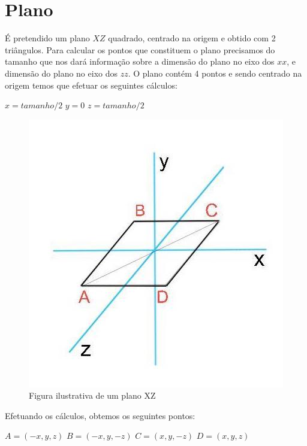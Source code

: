\documentclass[12pt]{article}
\begin{document}
\section{Plano}
É pretendido um plano $XZ$ quadrado, centrado na origem e obtido com 2 triângulos. 
Para calcular os pontos que constituem o plano precisamos do tamanho que nos dará informação sobre a dimensão do plano
no eixo dos $xx$, e dimensão do plano no eixo dos $zz$. 
O plano contém 4 pontos e sendo centrado na origem temos que efetuar os seguintes cálculos: \newline
\begin{center}
$x = tamanho/2$ \newline
$y = 0$ \newline
$z = tamanho/2$ \newline
\end{center}
\begin{figure}[H]
\centering\includegraphics[scale=0.4]{planoXZ} 
\caption{\label{fig:controller}Figura ilustrativa de um plano XZ}
\end{figure} 
Efetuando os cálculos, obtemos os seguintes pontos: \newline
\begin{center}
$A = (-x,y,z)$ \newline 
$B = (-x,y,-z)$ \newline 
$C = (x,y,-z)$ \newline 
$D = (x,y,z)$ \newline
\end{center}
\end{document}
